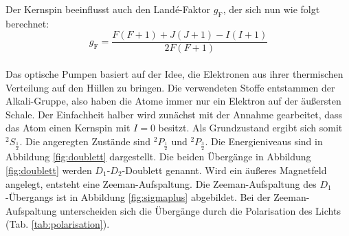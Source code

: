 Der Kernspin beeinflusst auch den Landé-Faktor $g_{\text{F}}$, der sich nun wie folgt berechnet:
\begin{equation}
  g_{\text{F}}= \frac{F(F+1) + J(J+1) - I(I+1)}{2 F(F+1)}
  \label{eqn:landef}
\end{equation}
%
%
\\Das optische Pumpen basiert auf der Idee, die Elektronen aus ihrer thermischen Verteilung auf den Hüllen zu bringen.
Die verwendeten Stoffe entstammen der Alkali-Gruppe, also haben die Atome immer nur ein Elektron auf der äußersten Schale.
Der Einfachheit halber wird zunächst mit der Annahme gearbeitet, dass das Atom einen Kernspin mit $I=0$ besitzt.
Als Grundzustand ergibt sich somit $^{2}S_{\frac{1}{2}}$.
Die angeregten Zustände sind $^{2}P_{\frac{1}{2}}$ und $^{2}P_{\frac{3}{2}}$.
Die Energieniveaus sind in Abbildung \ref{fig:doublett} dargestellt.
Die beiden Übergänge in Abbildung \ref{fig:doublett} werden $D_{1}$-$D_{2}$-Doublett genannt.
Wird ein äußeres Magnetfeld angelegt, entsteht eine Zeeman-Aufspaltung.
Die Zeeman-Aufspaltung des $D_{1}$-Übergangs ist in Abbildung \ref{fig:sigmaplus} abgebildet.
Bei der Zeeman-Aufspaltung unterscheiden sich die Übergänge durch die Polarisation des Lichts (Tab. \ref{tab:polarisation}).
